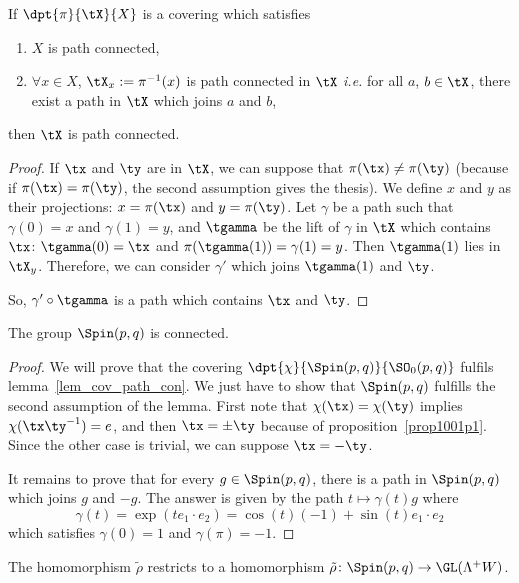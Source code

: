 \begin{lemma}
	If $\dpt{\pi}{\tX}{X}$ is a covering which satisfies

	\begin{enumerate}
		\item $X$ is path connected,
		\item $\forall x\in X$, $\tX_x:=\pi^{-1}(x)$ is path connected in $\tX$ \emph{i.e.} for all $a$, $b\in \tX$, there exist a path in $\tX$ which joins $a$ and $b$,
	\end{enumerate}
	then $\tX$ is path connected.
	\label{lem_cov_path_con}
\end{lemma}
\begin{proof}
	If $\tx$ and $\ty$ are in $\tX$, we can suppose that $\pi(\tx)\neq\pi(\ty)$ (because if $\pi(\tx)=\pi(\ty)$, the second assumption gives the thesis). We define $x$ and $y$ as their projections: $x=\pi(\tx)$ and $y=\pi(\ty)$. Let $\gamma$ be a path such that $\gamma(0)=x$ and $\gamma(1)=y$, and $\tgamma$ be the lift of $\gamma$ in $\tX$ which contains $\tx$: $\tgamma(0)=\tx$ and $\pi(\tgamma(1))=\gamma(1)=y$. Then $\tgamma(1)$ lies in $\tX_y$. Therefore, we can consider $\gamma'$ which joins $\tgamma(1)$ and $\ty$.

	So, $\gamma'\circ\tgamma$ is a path which contains $\tx$ and $\ty$.
\end{proof}


\begin{proposition}
	The group $\Spin(p,q)$ is connected.
\end{proposition}

\begin{proof}
	We will prove that the covering $\dpt{\chi}{\Spin(p,q)}{\SO_0(p,q)}$ fulfils lemma~\ref{lem_cov_path_con}. We just have to show that $\Spin(p,q)$ fulfills the second assumption of the lemma. First note that $\chi(\tx)=\chi(\ty)$ implies $\chi(\tx\ty^{-1})=e$, and then $\tx=\pm\ty$ because of proposition~\ref{prop1001p1}. Since the other case is trivial, we can suppose $\tx=-\ty$.

	It remains to prove that for every $g\in\Spin(p,q)$, there is a path in $\Spin(p,q)$ which joins $g$ and $-g$. The answer is given by the path $t\mapsto \gamma(t)g$ where
	\[
		\gamma(t)=\exp(te_1\cdot e_2)=\cos(t)(-1)+\sin(t)e_1\cdot e_2
	\]
	which satisfies $\gamma(0)=1$ and $\gamma(\pi)=-1$.
\end{proof}

\begin{proposition}

	The homomorphism $\tilde\rho$ restricts to a homomorphism $\tilde\rho\colon \Spin(p,q)\to \GL(\Lambda^+W)$.
\end{proposition}

